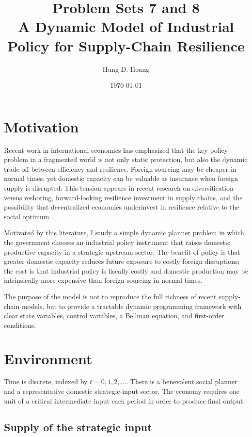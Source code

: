 \documentclass[11pt]{article}
\title{Problem Sets 7 and 8 \\ A Dynamic Model of Industrial Policy for Supply-Chain Resilience}
\author{Hung D. Hoang}
\date{\today}
\begin{document}
\maketitle

\section{Motivation}

Recent work in international economics has emphasized that the key policy problem in a fragmented world is not only static protection, but also the dynamic trade-off between efficiency and resilience. Foreign sourcing may be cheaper in normal times, yet domestic capacity can be valuable as insurance when foreign supply is disrupted. This tension appears in recent research on diversification versus reshoring, forward-looking resilience investment in supply chains, and the possibility that decentralized economies underinvest in resilience relative to the social optimum \citep{GHL2023,GHS2024,CDS2024}.

Motivated by this literature, I study a simple dynamic planner problem in which the government chooses an industrial policy instrument that raises domestic productive capacity in a strategic upstream sector. The benefit of policy is that greater domestic capacity reduces future exposure to costly foreign disruptions; the cost is that industrial policy is fiscally costly and domestic production may be intrinsically more expensive than foreign sourcing in normal times.

The purpose of the model is not to reproduce the full richness of recent supply-chain models, but to provide a tractable dynamic programming framework with clear state variables, control variables, a Bellman equation, and first-order conditions.

\section{Environment}

Time is discrete, indexed by $t=0,1,2,\dots$. There is a benevolent social planner and a representative domestic strategic-input sector. The economy requires one unit of a critical intermediate input each period in order to produce final output.

\subsection{Supply of the strategic input}
\end{document}
